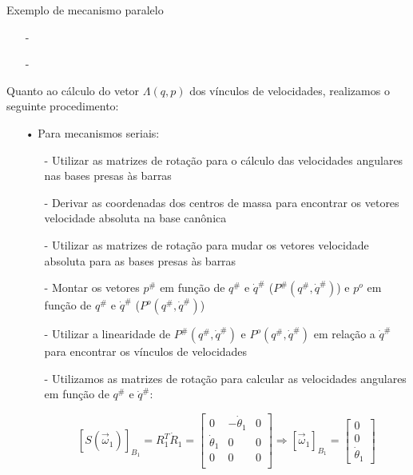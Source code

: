 \documentclass[12pt,a4paper]{article}
\begin{document}
\begin{itemize}
\begin{itemize}
	\end{itemize}

Exemplo de mecanismo paralelo

\begin{itemize}
\item[-]
\item[-]
\end{itemize}

Quanto ao cálculo do vetor $\Lambda(q,p)$ dos vínculos de velocidades, realizamos o seguinte procedimento:
\begin{itemize}

\item[•] Para mecanismos seriais:

	\begin{itemize}
	\item[-] Utilizar as matrizes de rotação para o cálculo das velocidades angulares nas bases presas às barras
	\item[-] Derivar as coordenadas dos centros de massa para encontrar os vetores velocidade absoluta na base canônica
	\item[-] Utilizar as matrizes de rotação para mudar os vetores velocidade absoluta para as bases presas às barras
	\item[-] Montar os vetores $p^{\#}$ em função de $q^{\#}$ e $\dot{q}^{\#}$ ($P^{\#} (q^{\#}, \dot{q}^{\#} )$) e $p^o$ em função de 			$q^{\#}$ e $\dot{q}^{\#}$ ($P^o (q^{\#}, \dot{q}^{\#} )$)
	\item[-]  Utilizar a linearidade de $P^{\#} (q^{\#}, \dot{q}^{\#} )$ e $P^o (q^{\#}, \dot{q}^{\#} )$ em relação a $\dot{q}^{\#}$ para 			encontrar os vínculos de velocidades
	\end{itemize}



\begin{itemize}
\item[-] Utilizamos as matrizes de rotação para calcular as velocidades angulares em função de $q^{\#}$ e $\dot{q}^{\#}$:

$$ [S(\vec{\omega}_1)]_{B_1} = R_1^T \dot{R}_1 =
\begin{bmatrix}
0 & -\dot{\theta}_1 & 0 \\
\dot{\theta}_1 & 0 & 0 \\
0 & 0 & 0 \\
\end{bmatrix}
\Rightarrow
[\vec{\omega}_1]_{B_1} =
\begin{bmatrix}
0 \\
0 \\
\dot{\theta}_1
\end{bmatrix}
$$


\end{itemize}
\end{itemize}
\end{itemize}
\end{document}
